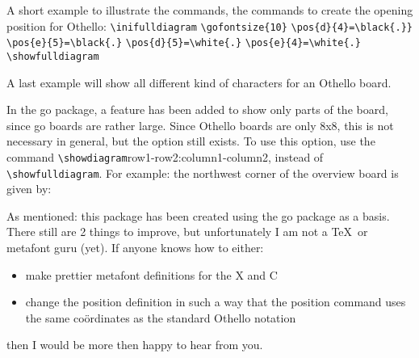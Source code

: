 \documentclass[12pt,twoside]{report}
\begin{document}
\noindent A short example to illustrate the commands, the commands to create
the opening position for Othello:
{\obeylines
{\verb|\inifulldiagram|}
{\verb|\gofontsize{10}|}
{\verb|\pos{d}{4}=\black{.}}|}
{\verb|\pos{e}{5}=\black{.}|}
{\verb|\pos{d}{5}=\white{.}|}
{\verb|\pos{e}{4}=\white{.}|}
{\verb|\showfulldiagram|}}

A last example will show all different kind of characters for an
Othello board.

\begin{figure}
\overviewboard
\end{figure}

In the go package, a feature has been added to show only parts of
the board, since go boards are rather large. Since Othello boards
are only 8x8, this is not necessary in general, but the option
still exists. To use this option, use the command
{\verb|\showdiagram|}row1-row2:column1-column2, instead of
{\verb|\showfulldiagram|}. For example: the northwest corner of
the overview board is given by:

\begin{figure}
\overviewboardcorner
\end{figure}

As mentioned: this package has been created using the go package
as a basis. There still are 2 things to improve, but unfortunately
I am not a \TeX\ or metafont guru (yet). If anyone knows how to
either:
\begin{itemize}
\item make prettier metafont definitions for the X and C
\item change the position definition in such a way that the position
command uses the same co\"ordinates as the standard Othello
notation
\end{itemize}
then I would be more then happy to hear from you.
\printindex
\end{document}
